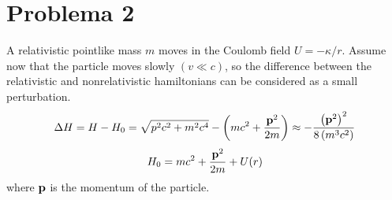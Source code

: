 \documentclass[]{article}
\numberwithin{equation}{section}
\begin{document}
\section{Problema 2}
A relativistic pointlike mass $m$ moves in the Coulomb field $U = -\kappa/r$. Assume now that the particle moves slowly $(v \ll c)$, so the difference between the relativistic and nonrelativistic hamiltonians can be considered as a small perturbation.
\begin{equation}
	\Delta H = H - H_0 = \sqrt{p^2 c^2 + m^2 c^4} - \left(m c^2 + \frac{\mathbf{p}^2}{2m}\right) \approx - \frac{\left(\mathbf{p}^2\right)^2}{8 \left(m^3 c^2\right)}
\end{equation}
\begin{equation}
	H_0 = m c^2 + \frac{\mathbf{p}^2}{2 m} + U(r)
\end{equation}
where $\mathbf{p}$ is the momentum of the particle.
\end{document}
